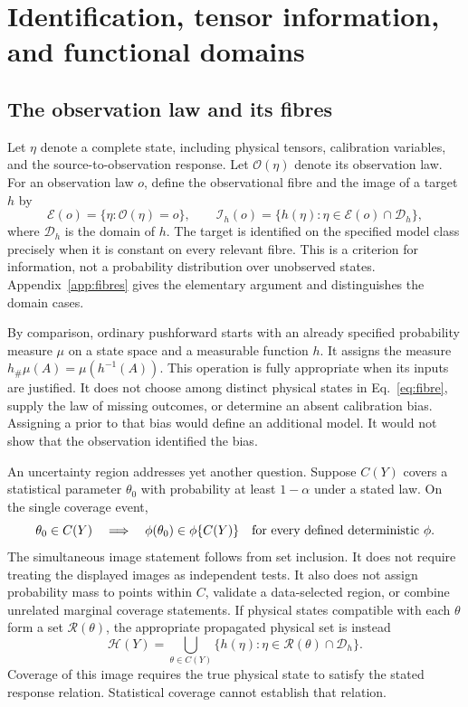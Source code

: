\section{Identification, tensor information, and functional domains}
\label{sec:identification}

\subsection{The observation law and its fibres}

Let $\eta$ denote a complete state, including physical tensors, calibration variables, and the source-to-observation response. Let $\mathcal O(\eta)$ denote its observation law. For an observation law $o$, define the observational fibre and the image of a target $h$ by
\begin{equation}
 \mathcal E(o)=\{\eta:\mathcal O(\eta)=o\},\qquad
 \mathcal I_h(o)=\{h(\eta):\eta\in\mathcal E(o)\cap\mathcal D_h\},
 \label{eq:fibre}
\end{equation}
where $\mathcal D_h$ is the domain of $h$. The target is identified on the specified model class precisely when it is constant on every relevant fibre. This is a criterion for information, not a probability distribution over unobserved states. Appendix~\ref{app:fibres} gives the elementary argument and distinguishes the domain cases.

By comparison, ordinary pushforward starts with an already specified probability measure $\mu$ on a state space and a measurable function $h$. It assigns the measure $h_\#\mu(A)=\mu(h^{-1}(A))$. This operation is fully appropriate when its inputs are justified. It does not choose among distinct physical states in Eq.~\eqref{eq:fibre}, supply the law of missing outcomes, or determine an absent calibration bias. Assigning a prior to that bias would define an additional model. It would not show that the observation identified the bias.

An uncertainty region addresses yet another question. Suppose $C(Y)$ covers a statistical parameter $\theta_0$ with probability at least $1-\alpha$ under a stated law. On the single coverage event,
\begin{equation}
 \theta_0\in C(Y)\quad\Longrightarrow\quad
 \phi(\theta_0)\in\phi\{C(Y)\}
 \quad\hbox{for every defined deterministic }\phi.
 \label{eq:coverageimage}
\end{equation}
The simultaneous image statement follows from set inclusion. It does not require treating the displayed images as independent tests. It also does not assign probability mass to points within $C$, validate a data-selected region, or combine unrelated marginal coverage statements. If physical states compatible with each $\theta$ form a set $\mathcal R(\theta)$, the appropriate propagated physical set is instead
\begin{equation}
 \mathcal H(Y)=\bigcup_{\theta\in C(Y)}\{h(\eta):\eta\in\mathcal R(\theta)\cap\mathcal D_h\}.
 \label{eq:physicalimage}
\end{equation}
Coverage of this image requires the true physical state to satisfy the stated response relation. Statistical coverage cannot establish that relation.

